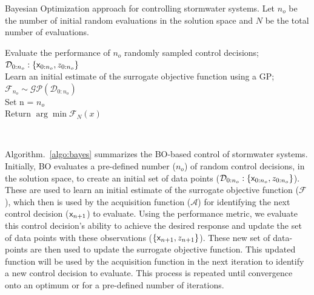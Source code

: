 \begin{algorithm}
\caption{Bayesian Optimization approach for controlling stormwater systems. Let $n_o$ be the number of initial random eval\-uations in the solution space and $N$ be the total number of evaluations.}\label{algo:bayes}
Evaluate the performance of $n_o$ randomly sampled control decisions;  $\mathcal{D}_{0:n_o}:\{{\mathsf{x}}_{0:n_o}, z_{0:n_o}\}$\\
Learn an initial estimate of the surrogate objective function using a GP; $\mathcal{F}_{n_o} \sim \mathcal{GP}(\mathcal{D}_{0:n_o})$\\
Set n = $n_o$\\
Return $\arg\min \mathcal{F}_N(x)$
\end{algorithm}

\

Algorithm.~\ref{algo:bayes} summarizes the BO-based control of stormwater systems.
Initially, BO evaluates a pre-defined number ($n_o$) of random control decisions, in the solution space, to create an initial set of data points ($\mathcal{D}_{0:n_o}:\{ {\mathsf{x}}_{0:n_o}, z_{0:n_o} \}$). 
These are used to learn an initial estimate of the surrogate objective function ($\mathcal{F}$), which then is used by the acquisition function ($\mathcal{A}$) for identifying the next control decision (${\mathsf{x}}_{n+1}$) to evaluate.
Using the performance metric, we evaluate this control decision's ability to achieve the desired response and update the set of data points with these observations ($\{ {\mathsf{x}}_{n+1}, z_{n+1}\}$).
These new set of data-points are then used to update the surrogate objective function.
This updated function will be used by the acquisition function in the next iteration to identify a new control decision to evaluate.
This process is repeated until convergence onto an optimum or for a pre-defined number of iterations.

\

